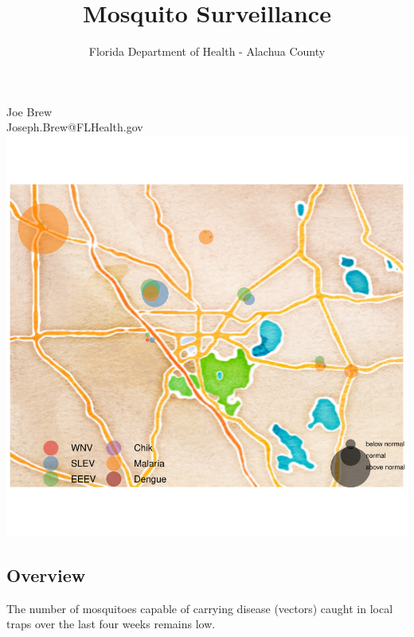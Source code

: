 \documentclass{article}
\title{Mosquito Surveillance}
\author{Florida Department of Health - Alachua County}
\begin{document}

\maketitle
\begin{center}
Joe Brew\\
Joseph.Brew@FLHealth.gov\\

\includegraphics{mosq04nov13-002}
\end{center}
\newpage
\tableofcontents




\begin{center}
\section*{Overview}

\end{center}
The number of mosquitoes capable of carrying disease (vectors) caught in local traps over the last four weeks remains low.
\end{document}
